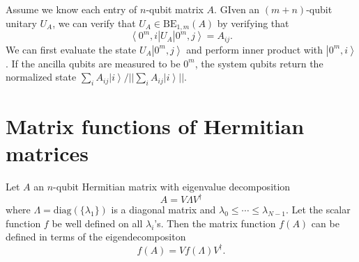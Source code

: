 \documentclass[11pt]{article}
\newcommand{\bra}[1]{\left\langle #1\right|}
\newcommand{\ket}[1]{\left|#1\right\rangle}
\begin{document}
Assume we know each entry of  $n$-qubit matrix $A$. GIven an $(m+n)$-qubit unitary $U_A$, we can verify that $U_A\in \text{BE}_{1,m}(A)$ by verifying that 
\begin{equation}
    \bra{0^m,i}U_A\ket{0^m,j} = A_{ij}.
\end{equation}
We can first evaluate the state $U_A\ket{0^m,j}$ and perform inner product with $\ket{0^m,i}$. If the ancilla qubits are measured to be $0^m$, the system qubits return the normalized state $\sum_iA_{ij}\ket{i}/||\sum_iA_{ij}\ket{i}||$.

\section{Matrix functions of Hermitian matrices}
Let $A$ an $n$-qubit Hermitian matrix with eigenvalue decomposition 
\begin{equation}
    A = V\Lambda V^{\dagger}
\end{equation}
where $\Lambda = \text{diag}(\{\lambda_1\})$ is a diagonal matrix and $\lambda_0\leq\cdots\leq\lambda_{N-1}$. Let the scalar function $f$ be well defined on all $\lambda_i$'s. Then the matrix function $f(A)$ can be defined in terms of the eigendecompositon 
\begin{equation}
    f(A) = Vf(\Lambda)V^{\dagger}.
\end{equation}
\end{document}
